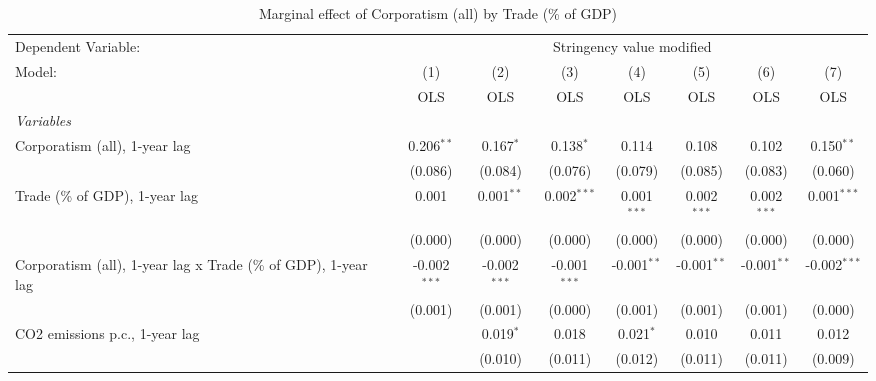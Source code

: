 
\begin{table}[htbp]
   \caption{Marginal effect of Corporatism (all) by Trade (\% of GDP)}
   \centering
   \begin{tabular}{lccccccc}
      \toprule
      Dependent Variable: & \multicolumn{7}{c}{Stringency value modified}\\
      Model:                                                         & (1)            & (2)            & (3)            & (4)           & (5)           & (6)           & (7)\\  
                                                                     &  OLS           & OLS            & OLS            & OLS           & OLS           & OLS           & OLS\\  
      \midrule
      \emph{Variables}\\
      Corporatism (all), 1-year lag                                  & 0.206$^{**}$   & 0.167$^{*}$    & 0.138$^{*}$    & 0.114         & 0.108         & 0.102         & 0.150$^{**}$\\   
                                                                     & (0.086)        & (0.084)        & (0.076)        & (0.079)       & (0.085)       & (0.083)       & (0.060)\\   
      Trade (\% of GDP), 1-year lag                                  & 0.001          & 0.001$^{**}$   & 0.002$^{***}$  & 0.001$^{***}$ & 0.002$^{***}$ & 0.002$^{***}$ & 0.001$^{***}$\\   
                                                                     & (0.000)        & (0.000)        & (0.000)        & (0.000)       & (0.000)       & (0.000)       & (0.000)\\   
      Corporatism (all), 1-year lag x Trade (\% of GDP), 1-year lag  & -0.002$^{***}$ & -0.002$^{***}$ & -0.001$^{***}$ & -0.001$^{**}$ & -0.001$^{**}$ & -0.001$^{**}$ & -0.002$^{***}$\\   
                                                                     & (0.001)        & (0.001)        & (0.000)        & (0.001)       & (0.001)       & (0.001)       & (0.000)\\   
      CO2 emissions p.c., 1-year lag                                 &                & 0.019$^{*}$    & 0.018          & 0.021$^{*}$   & 0.010         & 0.011         & 0.012\\   
                                                                     &                & (0.010)        & (0.011)        & (0.012)       & (0.011)       & (0.011)       & (0.009)\\   

\end{tabular}
\end{table}
